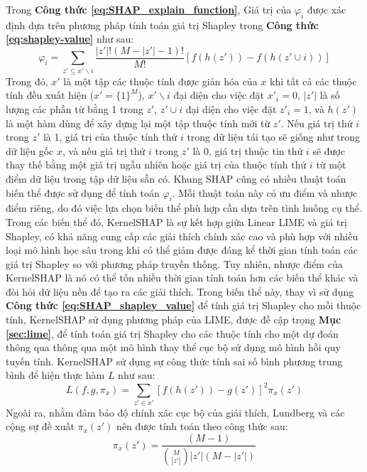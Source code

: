 \bigbreak\noindent
Trong \textbf{Công thức \ref{eq:SHAP_explain_function}}, Giá trị của $\varphi_i$ được xác định dựa trên phương pháp tính toán giá trị Shapley trong \textbf{Công thức \ref{eq:shapley-value}} như sau:
\begin{equation} \label{eq:SHAP_shapley_value}
    \varphi_i = \sum_{z' \subseteq x' \backslash {i}} \frac{|z'|!(M - |z'| - 1)!}{M!} [f(h(z')) - f(h(z' \cup i))]
\end{equation}
Trong đó, $x'$ là một tập các thuộc tính được giản hóa của $x$ khi tất cả các thuộc tính đều xuất hiện ($x' = \{1\}^M$), $x' \backslash {i}$ đại diện cho việc đặt $x'_i=0$, $|z'|$ là số lượng các phần từ bằng 1 trong $z'$, $z' \cup {i}$ đại diện cho việc đặt $z'_i=1$, và $h(z')$ là một hàm dùng để xây dựng lại một tập thuộc tính mới từ $z'$. Nếu giá trị thứ $i$ trong $z'$ là 1, giá trị của thuộc tính thứ $i$ trong dữ liệu tái tạo sẽ giống như trong dữ liệu gốc $x$, và nếu giá trị thứ $i$ trong $z'$ là 0, giá trị thuộc tin thứ $i$ sẽ được thay thế bằng một giá trị ngẫu nhiên hoặc giá trị của thuộc tính thứ $i$ từ một điểm dữ liệu trong tập dữ liệu sẵn có.
\bigbreak\noindent
Khung SHAP cũng có nhiều thuật toán biến thể được sử dụng để tính toán $\varphi_i$. Mỗi thuật toán này có ưu điểm và nhược điểm riêng, do đó việc lựa chọn biến thể phù hợp cần dựa trên tình huống cụ thể. Trong các biến thể đó, KernelSHAP là sự kết hợp giữa Linear LIME và giá trị Shapley, có khả năng cung cấp các giải thích chính xác cao và phù hợp với nhiều loại mô hình học sâu trong khi có thể giảm được đáng kể thời gian tính toán các giá trị Shapley so với phương pháp truyền thống. Tuy nhiên, nhược điểm của KernelSHAP là nó có thể tốn nhiều thời gian tính toán hơn các biến thể khác và đòi hỏi dữ liệu nền để tạo ra các giải thích. Trong biến thể này, thay vì sử dụng \textbf{Công thức \ref{eq:SHAP_shapley_value}} để tính giá trị Shapley cho mỗi thuộc tính, KernelSHAP sử dụng phương pháp của LIME, được đề cập trọng \textbf{Mục \ref{sec:lime}}, để tính toán giá trị Shapley cho các thuộc tính cho một dự đoán thông qua thông qua một mô hình thay thể cục bộ sử dụng mô hình hồi quy tuyến tính. KernelSHAP sử dụng sự công thức tính sai số bình phương trung bình để hiện thực hàm $L$ như sau:
\begin{equation} \label{eq:kernel_shap_loss_function}
    L(f, g, \pi_x) = \sum_{z' \in x'} [f(h(z')) - g(z')]^2 \pi_x(z')
\end{equation}
Ngoài ra, nhằm đảm bảo độ chính xác cục bộ của giải thích, Lundberg và các cộng sự \cite{lundberg2017unified} đề xuất $\pi_x(z')$ nên được tính toán theo công thức sau:
\begin{equation} \label{eq:kernel_shap_function}
    \pi_x(z') = \frac{(M-1)}{\binom{M}{|z'|}|z'|(M - |z'|)}
\end{equation}

